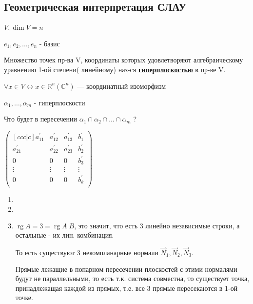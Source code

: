 \documentclass[twoside]{book}
\DeclareMathOperator{\rg}{rg}
\begin{document}
\subsection{Геометрическая интерпретация СЛАУ}

\(V, \dim V = n\)

\(e_1,e_2,\ldots, e_n\) - базис

Множество точек пр-ва V, координаты которых удовлетворяют алгебраическому уравнению 1-ой степени( линейному) наз-ся \uline{\textbf{гиперплоскостью}} в пр-ве V.

$\forall x \in V \leftrightarrow x \in \mathbb{R}^n(\mathbb{C}^n)$ --- координатный изоморфизм

$\alpha_1,\ldots,\alpha_m$ - гиперплоскости

Что будет в пересечении $\alpha_1 \cap \alpha_2 \cap \ldots \cap \alpha_m$ ?



\(
\begin{pmatrix}[ccc|c]
    a_{11}^{\prime} & a_{12}^{\prime} & a_{13}^{\prime} & b_{1}^{\prime} \\
    a_{21}^{\prime} & a_{22}^{\prime} & a_{23}^{\prime} & b_{2}^{\prime} \\
    0               & 0               & 0               & b_{3}^{\prime} \\
    \vdots          & \vdots          & \vdots          & \vdots         \\
    0               & 0               & 0               & b_{k}^{\prime} \\
\end{pmatrix}
\)

\begin{enumerate}
    \item
    \item
    \item \(\rg A = 3 = \rg A | B\), это значит, что есть 3 линейно независимые строки, а остальные - их лин. комбинация.

          То есть существуют 3 некомпланарные нормали \(\vec N_1, \vec N_2, \vec N_3\).

          Прямые лежащие в попарном пересечении плоскостей с этими нормалями будут не параллельными, то есть т.к. система совместна, то существует точка, принадлежащая каждой из прямых, т.е. все 3 прямые пересекаются в 1-ой точке.
\end{enumerate}
\end{document}
